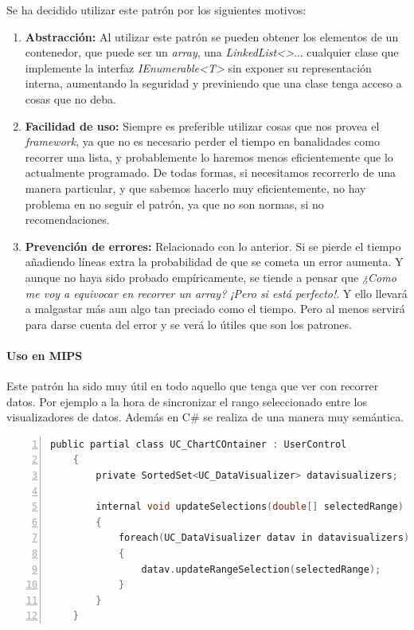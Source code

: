 Se ha decidido utilizar este patr\'{o}n por los siguientes motivos:
\begin{enumerate}
    \item \textbf{Abstracci\'{o}n:}
    Al utilizar este patr\'{o}n se pueden obtener los elementos de un contenedor, que puede ser un \emph{array}, una \emph{LinkedList<>}...
    cualquier clase que implemente la interfaz \emph{IEnumerable<T>} sin
    exponer su representaci\'{o}n interna, aumentando la seguridad y previniendo que una clase tenga acceso a cosas que no deba.
    
    \item \textbf{Facilidad de uso:}
    Siempre es preferible utilizar cosas que nos provea el \emph{framework}, ya que no es necesario perder el tiempo en banalidades como 
    recorrer una lista, y probablemente lo haremos menos eficientemente que lo actualmente programado. De todas formas, si necesitamos
    recorrerlo de una manera particular, y que sabemos hacerlo muy eficientemente, no hay problema en no seguir el patr\'{o}n, ya que no son
    normas, si no recomendaciones.
    
    \item \textbf{Prevenci\'{o}n de errores:}
    Relacionado con lo anterior. Si se pierde el tiempo a\~{n}adiendo l\'{i}neas extra la probabilidad de que se cometa un error 
    aumenta. Y aunque no haya sido probado emp\'{i}ricamente, se tiende a pensar que \emph{¿Como me voy a equivocar en 
    recorrer un array? ¡Pero si est\'{a} perfecto!}. 
    Y ello llevar\'{a} a malgastar m\'{a}s aun algo tan preciado como el tiempo. Pero al menos servir\'a para darse cuenta del error y 
    se ver\'a lo \'{u}tiles que son los patrones.
\end{enumerate}

\paragraph{Uso en MIPS}
Este patr\'on ha sido muy \'util en todo aquello que tenga que ver con recorrer datos. Por ejemplo a la hora de
sincronizar el rango seleccionado entre los visualizadores de datos. Adem\'as en C\# se realiza de una manera 
muy sem\'antica.

\begin{lstlisting}[language=C, numbers=left, showspaces=false, breaklines=true, tabsize=2]
	public partial class UC_ChartCOntainer : UserControl 
	{
		private SortedSet<UC_DataVisualizer> datavisualizers;
		
		internal void updateSelections(double[] selectedRange)
		{
			foreach(UC_DataVisualizer datav in datavisualizers) 
			{
				datav.updateRangeSelection(selectedRange);
			}
		}
	}
\end{lstlisting}

